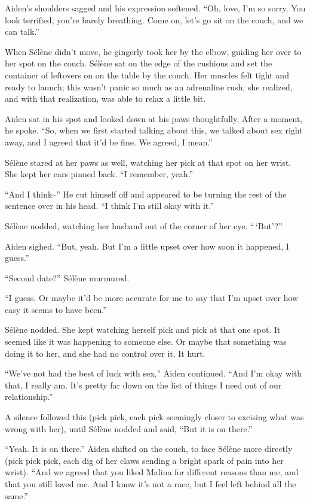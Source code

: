 Aiden's shoulders sagged and his expression softened. ``Oh, love, I'm so sorry. You look terrified, you're barely breathing. Come on, let's go sit on the couch, and we can talk.''

When Sélène didn't move, he gingerly took her by the elbow, guiding her over to her spot on the couch. Sélène sat on the edge of the cushions and set the container of leftovers on on the table by the couch. Her muscles felt tight and ready to launch; this wasn't panic so much as an adrenaline rush, she realized, and with that realization, was able to relax a little bit.

Aiden sat in his spot and looked down at his paws thoughtfully. After a moment, he spoke. ``So, when we first started talking about this, we talked about sex right away, and I agreed that it'd be fine. We agreed, I mean.''

Sélène stared at her paws as well, watching her pick at that spot on her wrist. She kept her ears pinned back. ``I remember, yeah.''

``And I think--'' He cut himself off and appeared to be turning the rest of the sentence over in his head. ``I think I'm still okay with it.''

Sélène nodded, watching her husband out of the corner of her eye. ``\,`But'?''

Aiden sighed. ``But, yeah. But I'm a little upset over how soon it happened, I guess.''

``Second date?'' Sélène murmured.

``I guess. Or maybe it'd be more accurate for me to say that I'm upset over how easy it seems to have been.''

Sélène nodded. She kept watching herself pick and pick at that one spot. It seemed like it was happening to someone else. Or maybe that something was doing it to her, and she had no control over it. It hurt.

``We've not had the best of luck with sex,'' Aiden continued. ``And I'm okay with that, I really am. It's pretty far down on the list of things I need out of our relationship.''

A silence followed this (pick pick, each pick seemingly closer to excising what was wrong with her), until Sélène nodded and said, ``But it is on there.''

``Yeah. It is on there.'' Aiden shifted on the couch, to face Sélène more directly (pick pick pick, each dig of her claws sending a bright spark of pain into her wrist). ``And we agreed that you liked Malina for different reasons than me, and that you still loved me. And I know it's not a race, but I feel left behind all the same.''

